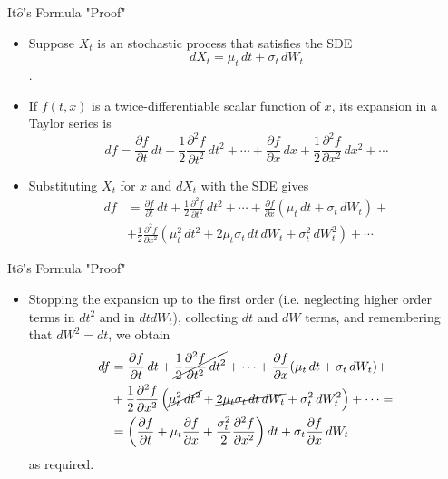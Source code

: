 \documentclass{beamer}
\begin{document}
\begin{frame}{It$\hat{o}$'s Formula "Proof"}
	\begin{itemize}
	\item Suppose $X_t$ is an stochastic process that satisfies the SDE
	\begin{equation*}	
	dX_{t}=\mu _{t}\,dt+\sigma _{t}\,dW_{t}
	\end{equation*}.
	\item If $f(t,x)$ is a twice-differentiable scalar function of $x$, its expansion in a Taylor series is
	\begin{equation*}
	df={\frac {\partial f}{\partial t}}\,dt+{\frac {1}{2}}{\frac {\partial ^{2}f}{\partial t^{2}}}\,dt^{2}+\cdots +{\frac {\partial f}{\partial x}}\,dx+{\frac {1}{2}}{\frac {\partial ^{2}f}{\partial x^{2}}}\,dx^{2}+\cdots
	\end{equation*}
	\item Substituting $X_t$ for $x$ and $dX_t$ with the SDE gives
	\begin{equation*}
		\begin{aligned}
		df&={\frac {\partial f}{\partial t}}\,dt+{\frac {1}{2}}{\frac {\partial ^{2}f}{\partial t^{2}}}\,dt^{2}+\cdots +{\frac {\partial f}{\partial x}}(\mu _{t}\,dt+\sigma _{t}\,dW_{t})+\\
		&+{\frac {1}{2}}{\frac {\partial ^{2}f}{\partial x^{2}}}\left(\mu _{t}^{2}\,dt^{2}+2\mu _{t}\sigma _{t}\,dt\,dW_{t}+\sigma _{t}^{2}\,dW_{t}^{2}\right)+\cdots
		\end{aligned}
	\end{equation*}
\end{itemize}
\end{frame}

\begin{frame}{It$\hat{o}$'s Formula "Proof"}
	\begin{itemize}
	\item Stopping the expansion up to the first order (i.e. neglecting higher order terms in $dt^2$ and in $dt dW_t$), collecting $dt$ and $dW$ terms, and remembering that $dW^2=dt$, we obtain
	\begin{equation*}
		\begin{aligned}
			df&={\frac {\partial f}{\partial t}}\,dt+\cancel{{\frac {1}{2}}{\frac {\partial ^{2}f}{\partial t^{2}}}\,dt^{2}}+\cdots +{\frac {\partial f}{\partial x}}(\mu _{t}\,dt+\sigma _{t}\,dW_{t})+\\
			&+{\frac {1}{2}}{\frac {\partial ^{2}f}{\partial x^{2}}}\left(\cancel{\mu _{t}^{2}\,dt^{2}}+\cancel{2\mu _{t}\sigma _{t}\,dt\,dW_{t}}+\sigma _{t}^{2}\,dW_{t}^{2}\right)+\cdots =\\
			&=\left({\frac {\partial f}{\partial t}}+\mu _{t}{\frac {\partial f}{\partial x}}+{\frac {\sigma _{t}^{2}}{2}}{\frac {\partial ^{2}f}{\partial x^{2}}}\right)dt+\sigma _{t}{\frac {\partial f}{\partial x}}\,dW_{t}
		\end{aligned}
	\end{equation*}
	as required.
\end{itemize}
\end{frame}
\end{document}
